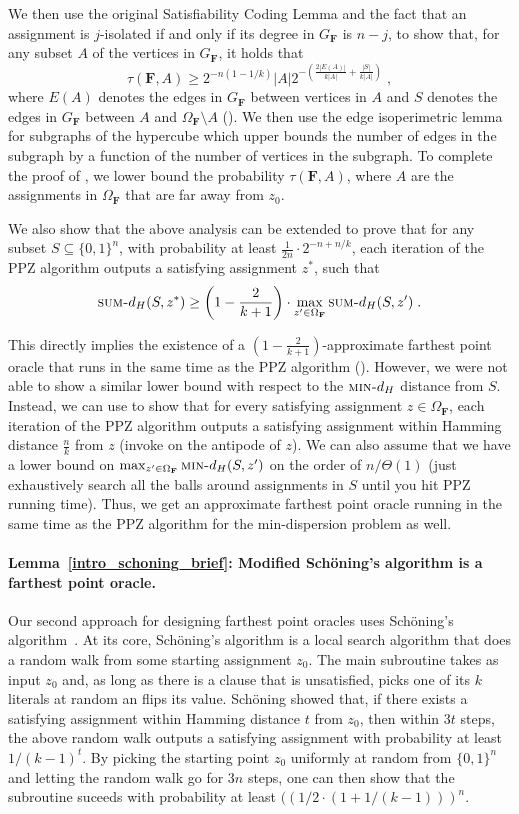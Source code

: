 \documentclass[11pt, letterpaper]{article}
\theoremstyle{definition}
\newcommand{\Q}[1]{\{0,1\}^{#1}}
\newcommand{\f}{\mathbf{F}}
\newcommand{\Om}{\Omega_{\f}}
\newcommand{\sumd}{\textsc{sum-}d_H}
\newcommand{\mind}{\textsc{min-}d_H}
\newcommand{\sch}{Sch\"{o}ning\xspace}
\begin{document}
We then use the original Satisfiability Coding Lemma and the fact that an assignment is $j$-isolated if and only if its degree in $G_\f$ is $n-j$, to  show that, for any subset $A$ of the vertices in $G_\f$, it holds that
 $$\tau(\f,A) \geq 2^{-n(1-1/k)}|A|2^{-\left(  \frac{2|E(A)|}{k|A|}+\frac{|S|}{k|A|}\right)}\;,$$ where $E(A)$ denotes the edges in $G_\f$ between vertices in $A$ and $S$ denotes the edges in $G_\f$ between $A$ and $\Om \setminus A$ (). 
 We then use the edge isoperimetric lemma for subgraphs of the hypercube which upper bounds the number of edges in the subgraph by a function of the number of vertices in the subgraph. To complete the proof of , we lower bound the probability $\tau(\f,A)$, where $A$ are the assignments in $\Om$ that are far away from $z_0$.

We also show that the above analysis can be extended to prove that for any subset $S \subseteq \Q{n}$, with probability at least $\frac{1}{2n}\cdot 2^{-n+n/k}$, each iteration of the PPZ algorithm outputs a satisfying assignment $z^*$, such that $$\sumd(S,z^*) \geq \left(1- \frac{2}{k+1}\right) \cdot \max_{z' \in \Om} \sumd(S,z') \;.$$ 

This directly implies the existence of a $\left(1-\frac{2}{k+1}\right)$-approximate farthest point oracle that runs in the same time as the PPZ algorithm (). However, we were not able to show a similar lower bound with respect to the $\mind$ distance from $S$. Instead, we can use  to show that for every satisfying assignment $z \in \Om$, each iteration of the PPZ algorithm outputs a satisfying assignment within Hamming distance $\frac{n}{k}$ from $z$ (invoke  on the antipode of $z$). We can also assume that we have a lower bound on $\max_{z' \in \Om} \mind(S, z')$ on the order of $n/\Theta(1)$ (just exhaustively search all the balls around assignments in $S$ until you hit PPZ running time). Thus, we get an approximate farthest point oracle running in the same time as the PPZ algorithm for the min-dispersion problem as well.


\paragraph{Lemma~\ref{intro_schoning_brief}: Modified \sch's algorithm is a farthest point oracle.} Our second approach for designing farthest point oracles uses \sch's algorithm~\cite{schoning2002probabilistic}. At its core, \sch's algorithm is a local search algorithm that does a random walk from some starting assignment $z_0$. The main subroutine takes as input $z_0$ and, as long as there is a clause that is unsatisfied, picks one of its $k$ literals at random an flips its value. \sch showed that, if there exists a satisfying assignment within Hamming distance $t$ from $z_0$, then within $3t$ steps, the above random walk outputs a satisfying assignment with probability at least $1/(k-1)^t$. By picking the starting point $z_0$ uniformly at random from $\{0,1\}^n$ and letting the random walk go for $3n$ steps, one can then show that the subroutine suceeds with probability at least $((1/2\cdot (1 +1/(k-1)))^n$.
\end{document}
